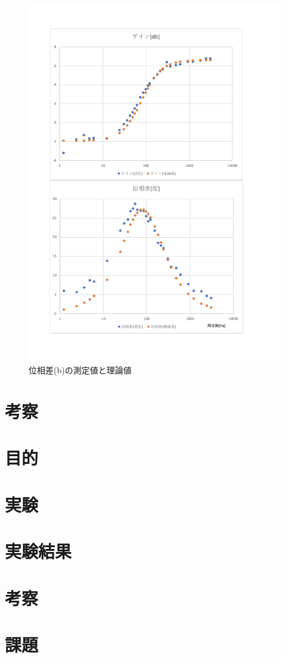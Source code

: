 \documentclass[uplatex, 11pt,a4j, titlepage]{jsarticle}
\begin{document}
\begin{figure}[h]
    \centering
    \includegraphics[width=12cm]{ideal_plot2.pdf}
    \caption{位相差(b)の測定値と理論値}
    \label{ideal_plot2}
\end{figure}

\section{考察}


\newpage




\section{目的}
\section{実験}
\section{実験結果}
\section{考察}
\section{課題}


\newpage
\thispagestyle{empty}
\nocite{Material}


\end{document}
